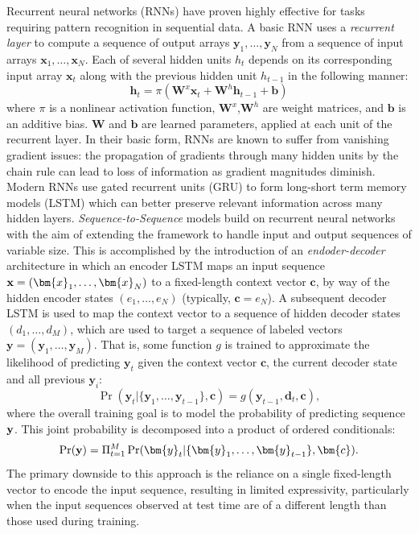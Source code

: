 Recurrent neural networks (RNNs) have proven highly effective for tasks requiring pattern recognition in sequential data. A basic RNN uses a \emph{recurrent layer} to compute a sequence of output arrays $\bm{y}_1, \ldots, \bm{y}_N$ from a sequence of input arrays  $\bm{x}_1, \ldots, \bm{x}_N$. Each of several hidden units $h_t$ depends on its corresponding input array $\bm{x}_t$ along with the previous hidden unit $h_{t-1}$ in the following manner:
$$ 
\bm{h}_t = \pi( \bm{W}^x \bm{x}_t + \bm{W}^h \bm{h}_{t-1} +  \bm{b}) 
$$
where $\pi$ is a nonlinear activation function, $\bm{W}^x$,$\bm{W}^h$ are weight matrices, and $\bm{b}$ is an additive bias. $\bm{W}$ and $\bm{b}$ are learned parameters, applied at each unit of the recurrent layer. 
In their basic form, RNNs are known to suffer from vanishing gradient issues: the propagation of gradients through many hidden units by the chain rule can lead to loss of information as gradient magnitudes diminish. Modern RNNs use gated recurrent units (GRU) to form long-short term memory models (LSTM) which can better preserve relevant information across many hidden layers. 
\emph{Sequence-to-Sequence}  models build on recurrent neural networks with the aim of extending the framework to handle input and output sequences of variable size. This is accomplished by the introduction of an \emph{endoder-decoder} architecture in which an encoder LSTM maps an input sequence ${\bf x} = (\bm{x}_1,\ldots,\bm{x}_N)$ to a fixed-length context vector $\bm{c}$, by way of the hidden encoder states $(e_1,\ldots,e_N)$ (typically, $\bm{c} = e_N$). 
A subsequent decoder LSTM is used to map the context vector to a sequence of hidden decoder states $(d_1,\ldots,d_M)$, which are used to target a sequence of labeled vectors $\bm{y} = (\bm{y}_1,\ldots, \bm{y}_M)$. That is, some function $g$ is trained to approximate the likelihood of predicting $\bm{y}_t$ given the context vector $\bm{c}$, the current decoder state and all previous $\bm{y}_i$:
\begin{equation*}
	\Pr(\bm{y}_t | \{ \bm{y}_1, \ldots, \bm{y}_{t-1} \}, \bm{c})   = 
	g(\bm{y}_{t-1}, \bm{d}_t, \bm{c}),
\end{equation*}
where the overall training goal is to model the probability of predicting sequence $\bf y$. This joint probability is decomposed into a product of ordered conditionals: 
\begin{equation*}
	\Pr({\bf y}) = \Pi_{t=1}^M 
		\Pr(\bm{y}_t | \{ \bm{y}_1, \ldots, \bm{y}_{t-1} \}, \bm{c}).
\end{equation*} 
The primary downside to this approach is the reliance on a single fixed-length vector to encode the input sequence, resulting in limited expressivity, particularly when the input sequences observed at test time are of a different length than those used during training. 
